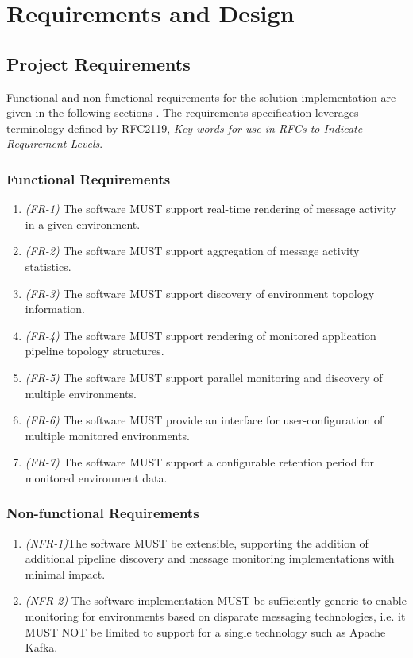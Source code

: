 \chapter{Requirements and Design}

\section{Project Requirements}\label{project_requirements}

Functional and non-functional requirements for the solution implementation are given in the following sections \cite{Sommerville}. The requirements specification leverages terminology defined by RFC2119, \textit{Key words for use in RFCs to Indicate Requirement Levels}.

\subsection{Functional Requirements}

\begin{enumerate}
	\item \textit{(FR-1)} The software MUST support real-time rendering of message activity in a given environment.
	\item \textit{(FR-2)} The software MUST support aggregation of message activity statistics.
	\item \textit{(FR-3)} The software MUST support discovery of environment topology information.
	\item \textit{(FR-4)} The software MUST support rendering of monitored application pipeline topology structures.
	\item \textit{(FR-5)} The software MUST support parallel monitoring and discovery of multiple environments.
	\item \textit{(FR-6)} The software MUST provide an interface for user-configuration of multiple monitored environments.
	\item \textit{(FR-7)} The software MUST support a configurable retention period for monitored environment data.
\end{enumerate}

\subsection{Non-functional Requirements}
\begin{enumerate}
	\item \textit{(NFR-1)}The software MUST be extensible, supporting the addition of additional pipeline discovery and message monitoring implementations with minimal impact.
	\item \textit{(NFR-2)} The software implementation MUST be sufficiently generic to enable monitoring for environments based on disparate messaging technologies, i.e. it MUST NOT be limited to support for a single technology such as Apache Kafka.
\end{enumerate}

